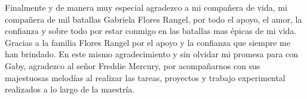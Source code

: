 Finalmente y de manera muy especial agradezco a mi compañera de vida, mi compañera de mil batallas Gabriela Flores Rangel, por todo el apoyo, el amor, la confianza y sobre todo por estar conmigo en las batallas mas épicas de mi vida. Gracias a la familia Flores Rangel por el apoyo y la confianza que siempre me han brindado. En este mismo agradecimiento y sin olvidar mi promesa para con Gaby, agradezco al señor Freddie Mercury, por acompañarnos con sus majestuosas melodías al realizar las tareas, proyectos y trabajo experimental realizados a lo largo de la maestría.  


\cleardoublepage